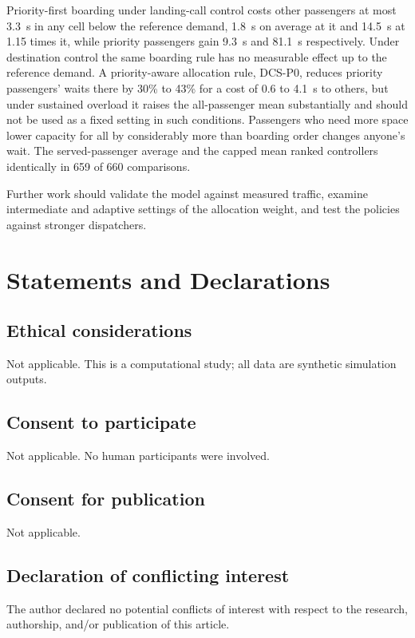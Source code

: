 \documentclass[12pt,a4paper]{article}
\begin{document}
Priority-first boarding under landing-call control costs other passengers at most 3.3~s in any cell below the reference demand, 1.8~s on average at it and 14.5~s at 1.15 times it, while priority passengers gain 9.3~s and 81.1~s respectively. Under destination control the same boarding rule has no measurable effect up to the reference demand. A priority-aware allocation rule, DCS-P0, reduces priority passengers' waits there by 30\% to 43\% for a cost of 0.6 to 4.1~s to others, but under sustained overload it raises the all-passenger mean substantially and should not be used as a fixed setting in such conditions. Passengers who need more space lower capacity for all by considerably more than boarding order changes anyone's wait. The served-passenger average and the capped mean ranked controllers identically in 659 of 660 comparisons.

Further work should validate the model against measured traffic, examine intermediate and adaptive settings of the allocation weight, and test the policies against stronger dispatchers.

\section*{Statements and Declarations}

\subsection*{Ethical considerations}
Not applicable. This is a computational study; all data are synthetic simulation outputs.

\subsection*{Consent to participate}
Not applicable. No human participants were involved.

\subsection*{Consent for publication}
Not applicable.

\subsection*{Declaration of conflicting interest}
The author declared no potential conflicts of interest with respect to the research, authorship, and/or publication of this article.
\end{document}
